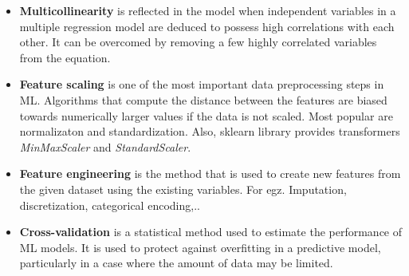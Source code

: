 \documentclass[
  letterpaper,
]{book}
\begin{document}
\begin{itemize}
\item
  \textbf{Multicollinearity} is reflected in the model when independent
  variables in a multiple regression model are deduced to possess high
  correlations with each other. It can be overcomed by removing a few
  highly correlated variables from the equation.
\item
  \textbf{Feature scaling} is one of the most important data
  preprocessing steps in ML. Algorithms that compute the distance
  between the features are biased towards numerically larger values if
  the data is not scaled. Most popular are normalizaton and
  standardization. Also, sklearn library provides transformers
  \emph{MinMaxScaler} and \emph{StandardScaler}.
\item
  \textbf{Feature engineering} is the method that is used to create new
  features from the given dataset using the existing variables. For egz.
  Imputation, discretization, categorical encoding,..
\item
  \textbf{Cross-validation} is a statistical method used to estimate the
  performance of ML models. It is used to protect against overfitting in
  a predictive model, particularly in a case where the amount of data
  may be limited.


\end{itemize}
\end{document}
